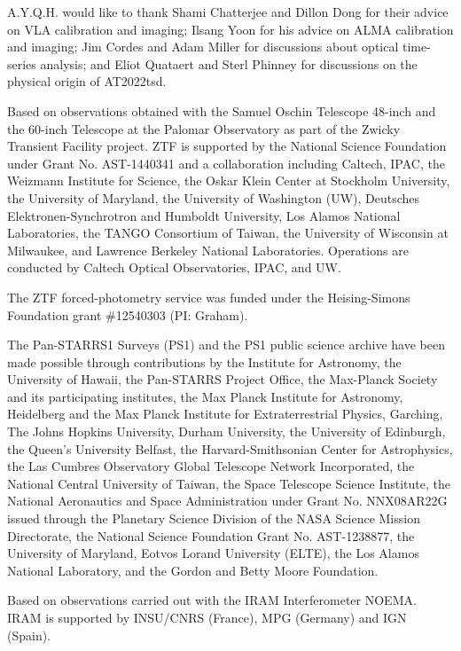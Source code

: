 \documentclass{nature_plusfigure}
\newcommand{\at}{AT2022tsd}
\begin{document}
\begin{addendum}

\item  A.Y.Q.H. would like to thank Shami Chatterjee and Dillon Dong for their advice on VLA calibration and imaging; Ilsang Yoon for his advice on ALMA calibration and imaging; Jim Cordes and Adam Miller for discussions about optical time-series analysis; and Eliot Quataert and Sterl Phinney for discussions on the physical origin of \at.

Based on observations obtained with the Samuel Oschin Telescope 48-inch and the 60-inch Telescope at the Palomar Observatory as part of the Zwicky Transient Facility project. ZTF is supported by the National Science Foundation under Grant No. AST-1440341 and a collaboration including Caltech, IPAC, the Weizmann Institute for Science, the Oskar Klein Center at Stockholm University, the University of Maryland, the University of Washington (UW), Deutsches Elektronen-Synchrotron and Humboldt University, Los Alamos National Laboratories, the TANGO Consortium of Taiwan, the University of Wisconsin at Milwaukee, and Lawrence Berkeley National Laboratories. Operations are conducted by Caltech Optical Observatories, IPAC, and UW.  

The ZTF forced-photometry service was funded under the Heising-Simons Foundation grant \#12540303 (PI: Graham).

The Pan-STARRS1 Surveys (PS1) and the PS1 public science archive have been made possible through contributions by the Institute for Astronomy, the University of Hawaii, the Pan-STARRS Project Office, the Max-Planck Society and its participating institutes, the Max Planck Institute for Astronomy, Heidelberg and the Max Planck Institute for Extraterrestrial Physics, Garching, The Johns Hopkins University, Durham University, the University of Edinburgh, the Queen's University Belfast, the Harvard-Smithsonian Center for Astrophysics, the Las Cumbres Observatory Global Telescope Network Incorporated, the National Central University of Taiwan, the Space Telescope Science Institute, the National Aeronautics and Space Administration under Grant No. NNX08AR22G issued through the Planetary Science Division of the NASA Science Mission Directorate, the National Science Foundation Grant No. AST-1238877, the University of Maryland, Eotvos Lorand University (ELTE), the Los Alamos National Laboratory, and the Gordon and Betty Moore Foundation.

Based on observations carried out with the IRAM Interferometer NOEMA. IRAM is supported by INSU/CNRS (France), MPG (Germany) and IGN (Spain).


\end{addendum}
\end{document}
